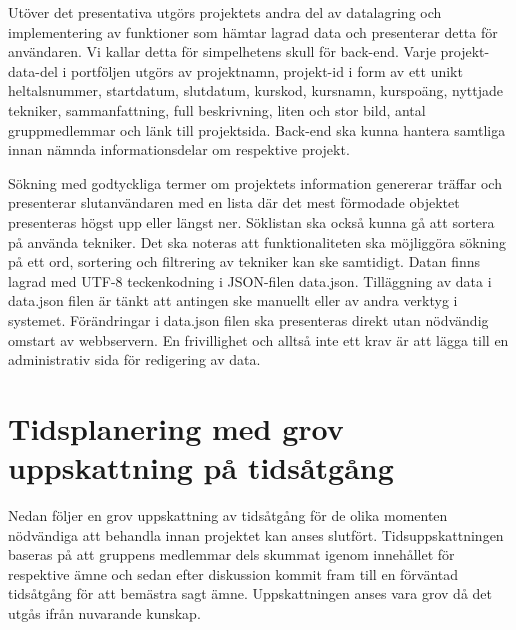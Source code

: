 \documentclass{TDP003mall}
\begin{document}
Utöver det presentativa utgörs projektets andra del av datalagring och implementering av funktioner som hämtar lagrad data och presenterar detta för användaren. Vi kallar detta för simpelhetens skull för back-end. Varje projekt-data-del i portföljen utgörs av projektnamn, projekt-id i form av ett unikt heltalsnummer, startdatum, slutdatum, kurskod, kursnamn, kurspoäng, nyttjade tekniker, sammanfattning, full beskrivning, liten och stor bild, antal gruppmedlemmar och länk till projektsida. Back-end ska kunna hantera samtliga innan nämnda informationsdelar om respektive projekt.

Sökning med godtyckliga termer om projektets information genererar träffar och presenterar slutanvändaren med en lista där det mest förmodade objektet presenteras högst upp eller längst ner. Söklistan ska också kunna gå att sortera på använda tekniker. Det ska noteras att funktionaliteten ska möjliggöra sökning på ett ord, sortering och filtrering av tekniker kan ske samtidigt. Datan finns lagrad med UTF-8 teckenkodning i JSON-filen data.json. Tilläggning av data i data.json filen är tänkt att antingen ske manuellt eller av andra verktyg i systemet. Förändringar i data.json filen ska presenteras direkt utan nödvändig omstart av webbservern. En frivillighet och alltså inte ett krav är att lägga till en administrativ sida för redigering av data.




\section{Tidsplanering med grov uppskattning på tidsåtgång}
Nedan följer en grov uppskattning av tidsåtgång för de olika momenten nödvändiga att behandla innan projektet kan anses slutfört. Tidsuppskattningen baseras på att gruppens medlemmar dels skummat igenom innehållet för respektive ämne och sedan efter diskussion kommit fram till en förväntad tidsåtgång för att bemästra sagt ämne. Uppskattningen anses vara grov då det utgås ifrån nuvarande kunskap.  
\end{document}

